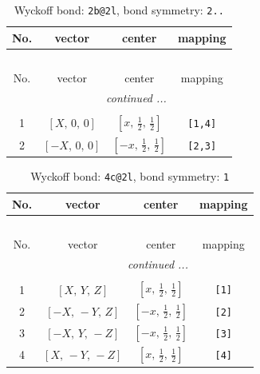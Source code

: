 \documentclass[fleqn,8pt]{jsarticle}
\begin{document}
\renewcommand{\arraystretch}{1.2}
\begin{longtable}{cccc}
\caption{Wyckoff bond: {\tt 2b@2l}, bond symmetry: {\tt 2..}}
 \\
 \hline \hline
No. & vector & center & mapping \\ \hline \endfirsthead

\multicolumn{3}{l}{\tablename\ \thetable{}} \\
 \hline \hline
No. & vector & center & mapping \\ \hline \endhead

 \hline \hline
\multicolumn{3}{r}{\footnotesize\it continued ...} \\ \endfoot

 \hline \hline
\multicolumn{3}{r}{} \\ \endlastfoot

1 & $\left[ X,\, 0,\, 0 \right]$ & $\left[ x,\, \frac{1}{2},\, \frac{1}{2} \right]$ & {\tt [1,4]} \\ \hline
2 & $\left[ - X,\, 0,\, 0 \right]$ & $\left[ - x,\, \frac{1}{2},\, \frac{1}{2} \right]$ & {\tt [2,3]} \\
\end{longtable}
\renewcommand{\arraystretch}{1.2}
\begin{longtable}{cccc}
\caption{Wyckoff bond: {\tt 4c@2l}, bond symmetry: {\tt 1}}
 \\
 \hline \hline
No. & vector & center & mapping \\ \hline \endfirsthead

\multicolumn{3}{l}{\tablename\ \thetable{}} \\
 \hline \hline
No. & vector & center & mapping \\ \hline \endhead

 \hline \hline
\multicolumn{3}{r}{\footnotesize\it continued ...} \\ \endfoot

 \hline \hline
\multicolumn{3}{r}{} \\ \endlastfoot

1 & $\left[ X,\, Y,\, Z \right]$ & $\left[ x,\, \frac{1}{2},\, \frac{1}{2} \right]$ & {\tt [1]} \\ \hline
2 & $\left[ - X,\, - Y,\, Z \right]$ & $\left[ - x,\, \frac{1}{2},\, \frac{1}{2} \right]$ & {\tt [2]} \\ \hline
3 & $\left[ - X,\, Y,\, - Z \right]$ & $\left[ - x,\, \frac{1}{2},\, \frac{1}{2} \right]$ & {\tt [3]} \\ \hline
4 & $\left[ X,\, - Y,\, - Z \right]$ & $\left[ x,\, \frac{1}{2},\, \frac{1}{2} \right]$ & {\tt [4]} \\
\end{longtable}
\end{document}
